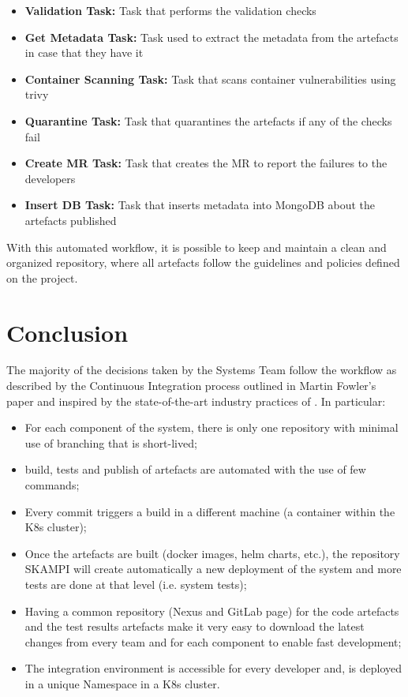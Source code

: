 \documentclass[a4paper,
               keeplastbox,   %
               ]{jacow}
\begin{document}
\begin{itemize}
    \item \textbf{Validation Task:} Task that performs the validation checks 
    \item \textbf{Get Metadata Task:} Task used to extract the metadata from the artefacts in case that they have it
    \item \textbf{Container Scanning Task:} Task that scans container vulnerabilities using trivy
    \item \textbf{Quarantine Task:} Task that quarantines the artefacts if any of the checks fail
    \item \textbf{Create MR Task:} Task that creates the MR to report the failures to the developers
    \item \textbf{Insert DB Task:} Task that inserts metadata into MongoDB about the artefacts published
\end{itemize}

With this automated workflow, it is possible to keep and maintain a clean and organized repository, where all artefacts follow the guidelines and policies defined on the project.


\section{Conclusion}
The majority of the decisions taken by the Systems Team follow the workflow as described by the Continuous Integration process outlined in Martin Fowler’s paper and inspired by the state-of-the-art industry practices of \cite{DevOps, CI, CD}. In particular:
\begin{itemize}
    \item For each component of the system, there is only one repository with minimal use of branching that is short-lived;
    \item build, tests and publish of artefacts are automated with the use of few commands;
    \item Every commit triggers a build in a different machine (a container within the K8s cluster);
    \item Once the artefacts are built (docker images, helm charts, etc.), the repository SKAMPI will create automatically a new deployment of the system and more tests are done at that level (i.e. system tests);
    \item Having a common repository (Nexus and GitLab page) for the code artefacts and the test results artefacts make it very easy to download the latest changes from every team and for each component to enable fast development;
    \item The integration environment is accessible for every developer and, is deployed in a unique Namespace in a K8s cluster.
\end{itemize}
\end{document}
